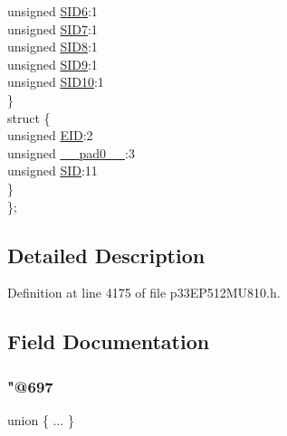\begin{DoxyCompactItemize}
\begin{tabbing}
\>\>unsigned \hyperlink{structtag_c1_r_x_f8_s_i_d_b_i_t_s_a70d70952133eb2389d5c326f9f0e8035}{SID6}:1\\
\>\>unsigned \hyperlink{structtag_c1_r_x_f8_s_i_d_b_i_t_s_a34097fb76decd431701fa2d86a22328e}{SID7}:1\\
\>\>unsigned \hyperlink{structtag_c1_r_x_f8_s_i_d_b_i_t_s_afe74894633244fdb0b0c01b4e8c522e7}{SID8}:1\\
\>\>unsigned \hyperlink{structtag_c1_r_x_f8_s_i_d_b_i_t_s_a33587704948067005c2a6a3ccc503c99}{SID9}:1\\
\>\>unsigned \hyperlink{structtag_c1_r_x_f8_s_i_d_b_i_t_s_a1a9084031c7f5fb16007feeebf0d8216}{SID10}:1\\
\>\} \\
\>struct \{\\
\>\>unsigned \hyperlink{structtag_c1_r_x_f8_s_i_d_b_i_t_s_ae80b378c9141f7c03e0b4e55b5f4b54d}{EID}:2\\
\>\>unsigned \hyperlink{structtag_c1_r_x_f8_s_i_d_b_i_t_s_adf71f3d8410c1f1dbbc96680a92c49af}{\_\_pad0\_\_}:3\\
\>\>unsigned \hyperlink{structtag_c1_r_x_f8_s_i_d_b_i_t_s_af88edf93b2fee2432665bd84f51287e4}{SID}:11\\
\>\} \\
\}; \\

\end{tabbing}\end{DoxyCompactItemize}


\subsection{Detailed Description}


Definition at line 4175 of file p33\+E\+P512\+M\+U810.\+h.



\subsection{Field Documentation}
\mbox{\label{structtag_c1_r_x_f8_s_i_d_b_i_t_s_a0f3a7fee8ff35b909a4e805f8a918432}} 
\subsubsection{\texorpdfstring{"@697}{@697}}
{\footnotesize\ttfamily union \{ ... \} }

\mbox{\label{structtag_c1_r_x_f8_s_i_d_b_i_t_s_adf71f3d8410c1f1dbbc96680a92c49af}} 
